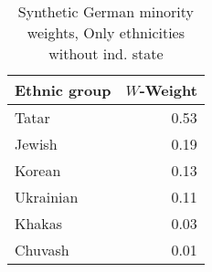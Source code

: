\begin{table}[t]

\caption{\label{tab:sc_weights_without_ind_state}Synthetic German minority weights, Only ethnicities without ind. state}
\centering
\begin{tabular}{lr}
\toprule
Ethnic group & $W$-Weight\\
\midrule
Tatar & 0.53\\
Jewish & 0.19\\
Korean & 0.13\\
Ukrainian & 0.11\\
Khakas & 0.03\\
Chuvash & 0.01\\
\bottomrule
\end{tabular}
\end{table}